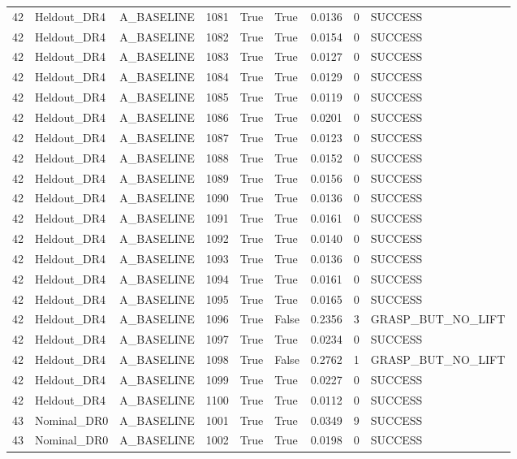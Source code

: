 \documentclass[11pt,a4paper,oneside]{book}
\begin{document}
\begin{longtable}{l l l l l l l l l}
42 & Heldout\_DR4 & A\_BASELINE & 1081 & True & True & 0.0136 & 0 & SUCCESS \\
42 & Heldout\_DR4 & A\_BASELINE & 1082 & True & True & 0.0154 & 0 & SUCCESS \\
42 & Heldout\_DR4 & A\_BASELINE & 1083 & True & True & 0.0127 & 0 & SUCCESS \\
42 & Heldout\_DR4 & A\_BASELINE & 1084 & True & True & 0.0129 & 0 & SUCCESS \\
42 & Heldout\_DR4 & A\_BASELINE & 1085 & True & True & 0.0119 & 0 & SUCCESS \\
42 & Heldout\_DR4 & A\_BASELINE & 1086 & True & True & 0.0201 & 0 & SUCCESS \\
42 & Heldout\_DR4 & A\_BASELINE & 1087 & True & True & 0.0123 & 0 & SUCCESS \\
42 & Heldout\_DR4 & A\_BASELINE & 1088 & True & True & 0.0152 & 0 & SUCCESS \\
42 & Heldout\_DR4 & A\_BASELINE & 1089 & True & True & 0.0156 & 0 & SUCCESS \\
42 & Heldout\_DR4 & A\_BASELINE & 1090 & True & True & 0.0136 & 0 & SUCCESS \\
42 & Heldout\_DR4 & A\_BASELINE & 1091 & True & True & 0.0161 & 0 & SUCCESS \\
42 & Heldout\_DR4 & A\_BASELINE & 1092 & True & True & 0.0140 & 0 & SUCCESS \\
42 & Heldout\_DR4 & A\_BASELINE & 1093 & True & True & 0.0136 & 0 & SUCCESS \\
42 & Heldout\_DR4 & A\_BASELINE & 1094 & True & True & 0.0161 & 0 & SUCCESS \\
42 & Heldout\_DR4 & A\_BASELINE & 1095 & True & True & 0.0165 & 0 & SUCCESS \\
42 & Heldout\_DR4 & A\_BASELINE & 1096 & True & False & 0.2356 & 3 & GRASP\_BUT\_NO\_LIFT \\
42 & Heldout\_DR4 & A\_BASELINE & 1097 & True & True & 0.0234 & 0 & SUCCESS \\
42 & Heldout\_DR4 & A\_BASELINE & 1098 & True & False & 0.2762 & 1 & GRASP\_BUT\_NO\_LIFT \\
42 & Heldout\_DR4 & A\_BASELINE & 1099 & True & True & 0.0227 & 0 & SUCCESS \\
42 & Heldout\_DR4 & A\_BASELINE & 1100 & True & True & 0.0112 & 0 & SUCCESS \\
43 & Nominal\_DR0 & A\_BASELINE & 1001 & True & True & 0.0349 & 9 & SUCCESS \\
43 & Nominal\_DR0 & A\_BASELINE & 1002 & True & True & 0.0198 & 0 & SUCCESS \\

\end{longtable}
\end{document}
